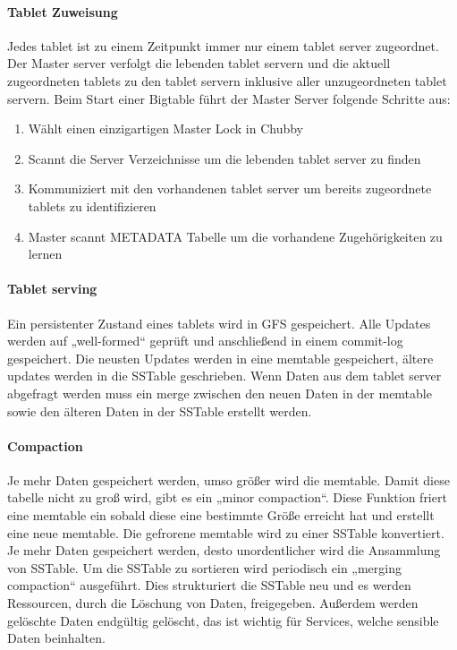 \paragraph{Tablet Zuweisung}
Jedes tablet ist zu einem Zeitpunkt immer nur einem tablet server zugeordnet. Der Master server verfolgt die lebenden tablet servern und die aktuell zugeordneten tablets zu den tablet servern inklusive aller unzugeordneten tablet servern.
Beim Start einer Bigtable führt der Master Server folgende Schritte aus:

\begin{enumerate}
	\item Wählt einen einzigartigen Master Lock in Chubby
	\item Scannt die Server Verzeichnisse um die lebenden tablet server zu finden
	\item Kommuniziert mit den vorhandenen tablet server um bereits zugeordnete tablets zu identifizieren
	\item Master scannt METADATA Tabelle um die vorhandene Zugehörigkeiten zu lernen
\end{enumerate}

\paragraph{Tablet serving}
Ein persistenter Zustand eines tablets wird in GFS gespeichert. Alle Updates werden auf „well-formed“ geprüft und anschließend in einem commit-log gespeichert. Die neusten Updates werden in eine memtable gespeichert, ältere updates werden in die SSTable geschrieben. Wenn Daten aus dem tablet server abgefragt werden muss ein merge zwischen den neuen Daten in der memtable sowie den älteren Daten in der SSTable erstellt werden.

\paragraph{Compaction}
Je mehr Daten gespeichert werden, umso größer wird die memtable. Damit diese tabelle nicht zu groß wird, gibt es ein „minor compaction“. Diese Funktion friert eine memtable ein sobald diese eine bestimmte Größe erreicht hat und erstellt eine neue memtable. Die gefrorene memtable wird zu einer SSTable konvertiert. Je mehr Daten gespeichert werden, desto unordentlicher wird die Ansammlung von SSTable. Um die SSTable zu sortieren wird periodisch ein „merging compaction“ ausgeführt. Dies strukturiert die SSTable neu und es werden Ressourcen, durch die Löschung von Daten, freigegeben. Außerdem werden gelöschte Daten endgültig gelöscht, das ist wichtig für Services, welche sensible Daten beinhalten.

